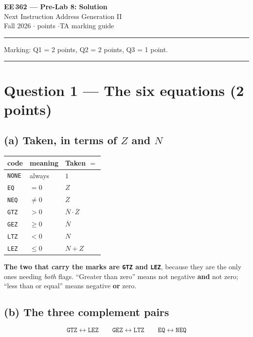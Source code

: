 \documentclass[11pt]{article}
\newcommand{\code}[1]{\texttt{#1}}
\newcommand{\hr}{\vspace{2pt}\hrule\vspace{6pt}}
\begin{document}
\begin{center}
{\Large\bfseries EE\,362 --- Pre-Lab 8: Solution}\\[2pt]
{\large Next Instruction Address Generation II}\\[4pt]
Fall 2026 \quad$\cdot$ points \quad$\cdot$\quad TA marking guide
\end{center}
\hr

{\small Marking: Q1 = 2 points, Q2 = 2 points, Q3 = 1 point.}

\vspace{4pt}\hr

\section*{Question 1 --- The six equations (2 points)}

\subsection*{(a) Taken, in terms of $Z$ and $N$}

\begin{center}
\begin{tabular}{lll}
\toprule
code & meaning & Taken $=$ \\
\midrule
\code{NONE} & always & $1$ \\
\code{EQ} & $= 0$ & $Z$ \\
\code{NEQ} & $\neq 0$ & $\overline{Z}$ \\
\code{GTZ} & $> 0$ & $\overline{N} \cdot \overline{Z}$ \\
\code{GEZ} & $\geq 0$ & $\overline{N}$ \\
\code{LTZ} & $< 0$ & $N$ \\
\code{LEZ} & $\leq 0$ & $N + Z$ \\
\bottomrule
\end{tabular}
\end{center}

\textbf{The two that carry the marks are \code{GTZ} and \code{LEZ}}, because they
are the only ones needing \emph{both} flags. ``Greater than zero'' means not
negative \textbf{and} not zero; ``less than or equal'' means negative
\textbf{or} zero.

\subsection*{(b) The three complement pairs}

\[
\code{GTZ} \leftrightarrow \code{LEZ}
\qquad
\code{GEZ} \leftrightarrow \code{LTZ}
\qquad
\code{EQ} \leftrightarrow \code{NEQ}
\]
\end{document}
